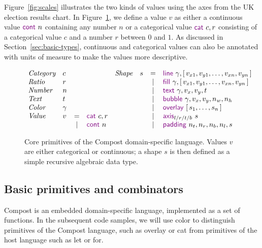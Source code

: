 \documentclass{jfp}
\newcommand{\kvd}[1]{\textnormal{\textcolor{kvdclr}{\sffamily #1}}}
\newcommand{\fkvd}[1]{\textnormal{\textcolor{fkvdclr}{\sffamily #1}}}
\begin{document}
Figure~\ref{fig:scales} illustrates the two kinds of values using the axes from the UK
election results chart. In Figure~\ref{fig:shape}, we define a value $v$ as either a continuous value
$\kvd{cont}~n$ containing any number $n$ or a categorical value $\kvd{cat}~c, r$ consisting
of a categorical value $c$ and a number $r$ between $0$ and $1$. As discussed in
Section~\ref{sec:basic-types}, continuous and categorical values can also be annotated with
units of measure to make the values more descriptive.
%
\begin{figure}
\begin{equation*}
\begin{array}{llcl}
\textit{Category} & c\\
\textit{Ratio} & r\\
\textit{Number} & n\\
\textit{Text} & t \\
\textit{Color} & \gamma \\
\textit{Value} & v & = & \kvd{cat}~c, r \\
&   & | & \kvd{cont}~n
\end{array}
\begin{array}{lrcl}
\textit{Shape} & s & = &\kvd{line}~\gamma, [\,v_{x1}, v_{y1}, \ldots, v_{xn}, v_{yn}\,]\\
&  & | & \kvd{fill}~\gamma, [\,v_{x1}, v_{y1}, \ldots, v_{xn}, v_{yn}\,] \\
&  & | & \kvd{text}~\gamma, v_x, v_y, t \\
&  & | & \kvd{bubble}~\gamma, v_x, v_y, n_w, n_h \\
&  & | & \kvd{overlay}~[\,s_1, \ldots, s_n\,] \\
&  & | &\kvd{axis}_{l/r/t/b}~s\\
&  & | &\kvd{padding}~n_t,n_r,n_b,n_l,s\\
\end{array}
\end{equation*}
\caption{Core primitives of the Compost domain-specific language. Values $v$ are either categorical
  or continuous; a shape $s$ is then defined as a simple recursive algebraic data type.}
\label{fig:shape}
\end{figure}

\subsection{Basic primitives and combinators}
\label{sec:basic-primitives}

Compost is an embedded domain-specific language, implemented as a set of functions. In the
subsequent code samples, we will use color to distinguish primitives of the Compost language,
such as \kvd{overlay} or \kvd{cat} from primitives of the host language such as \fkvd{let} or
\fkvd{for}.
\end{document}
